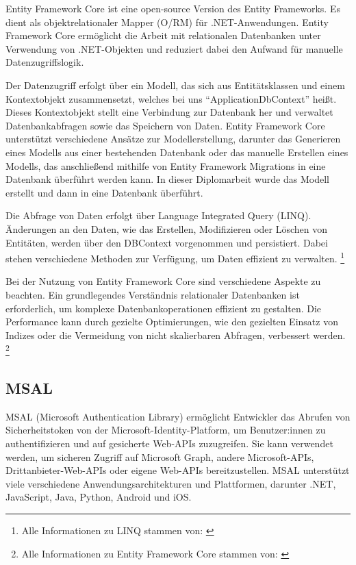 Entity Framework Core ist eine open-source Version des Entity Frameworks. Es dient 
als objektrelationaler Mapper (O\slash RM) für .NET-Anwendungen. Entity Framework Core ermöglicht 
die Arbeit mit relationalen Datenbanken unter Verwendung von .NET-Objekten und reduziert 
dabei den Aufwand für manuelle Datenzugriffslogik.

Der Datenzugriff erfolgt über ein Modell, das sich aus Entitätsklassen und einem 
Kontextobjekt zusammensetzt, welches bei uns ``ApplicationDbContext'' heißt. Dieses Kontextobjekt 
stellt eine Verbindung zur Datenbank her und verwaltet Datenbankabfragen sowie das Speichern 
von Daten. Entity Framework Core unterstützt verschiedene Ansätze zur Modellerstellung, 
darunter das Generieren eines Modells aus einer bestehenden Datenbank oder das manuelle 
Erstellen eines Modells, das anschließend mithilfe von Entity Framework Migrations in 
eine Datenbank überführt werden kann. In dieser Diplomarbeit wurde das Modell erstellt und dann
in eine Datenbank überführt.

Die Abfrage von Daten erfolgt über Language Integrated Query (LINQ). Änderungen an den Daten, 
wie das Erstellen, Modifizieren oder Löschen von Entitäten, werden über den DBContext 
vorgenommen und persistiert. Dabei stehen verschiedene Methoden zur Verfügung, 
um Daten effizient zu verwalten.
\footnote{Alle Informationen zu LINQ stammen von: \cite{MicrosoftCorporationq}}

Bei der Nutzung von Entity Framework Core sind verschiedene Aspekte zu beachten. Ein 
grundlegendes Verständnis relationaler Datenbanken ist erforderlich, um komplexe 
Datenbankoperationen effizient zu gestalten. Die Performance kann durch gezielte 
Optimierungen, wie den gezielten Einsatz von Indizes oder die Vermeidung von nicht 
skalierbaren Abfragen, verbessert werden.
\footnote{Alle Informationen zu Entity Framework Core stammen von: \cite{MicrosoftCorporationp}}


\subsection{MSAL}

MSAL (Microsoft Authentication Library) ermöglicht Entwickler das Abrufen von Sicherheitstoken 
von der Microsoft-Identity-Platform, um Benutzer:innen zu authentifizieren und auf gesicherte Web-APIs 
zuzugreifen. Sie kann verwendet werden, um sicheren Zugriff auf Microsoft Graph, andere 
Microsoft-APIs, Drittanbieter-Web-APIs oder eigene Web-APIs bereitzustellen. MSAL unterstützt 
viele verschiedene Anwendungsarchitekturen und Plattformen, darunter .NET, JavaScript, Java, 
Python, Android und iOS.

